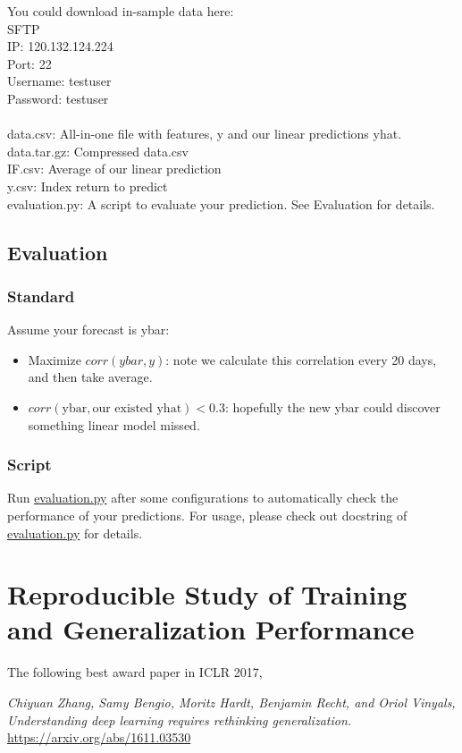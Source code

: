 \documentclass[11pt]{article}
\begin{document}
You could download in-sample data here: \\
SFTP  \\
IP: 120.132.124.224 \\
Port: 22 \\
Username: testuser \\
Password: testuser \\
\\
data.csv: All-in-one file with features, y and our linear predictions yhat. \\
data.tar.gz: Compressed data.csv \\
IF.csv: Average of our linear prediction \\
y.csv: Index return to predict  \\
evaluation.py: A script to evaluate your prediction. See Evaluation for details. 


\subsection{Evaluation}

\subsubsection{Standard}
Assume your forecast is ybar:
\begin{itemize}
\item Maximize $corr(ybar, y)$: note we calculate this correlation every 20 days, and then take average.
\item $corr(\text{ybar}, \text{our existed yhat}) < 0.3$: hopefully the new ybar could discover something linear model missed. 
\end{itemize}

\subsubsection{Script}
Run \url{evaluation.py} after some configurations to automatically check the performance of your predictions.
For usage, please check out docstring of \url{evaluation.py} for details.

\section{Reproducible Study of Training and Generalization Performance} 

The following best award paper in ICLR 2017, 

\emph{Chiyuan Zhang, Samy Bengio, Moritz Hardt, Benjamin Recht, and Oriol Vinyals, Understanding deep learning requires rethinking generalization.} \url{https://arxiv.org/abs/1611.03530}
\end{document}
